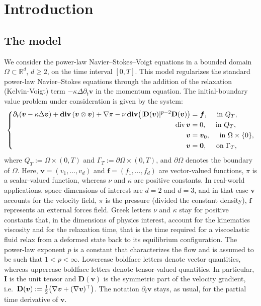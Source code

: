 \documentclass[12pt,reqno]{amsart}
\numberwithin{equation}{section}
\let\originalleft\left
\let\originalright\right
\renewcommand{\left}{\mathopen{}\mathclose\bgroup\originalleft}
\renewcommand{\right}{\aftergroup\egroup\originalright}
\theoremstyle{definition}
\def\1{\Omega}
\def\div{\operatorname{div}}
\def\divv{\mathbf{div}\,}
\def\vv{\boldsymbol{v}}
\def\f{\boldsymbol{f}}
\def\bfI{\mathbf{I}}
\def\bfD{\mathbf{D}}
\begin{document}
\section{Introduction}\label{sec1}

	\subsection{The model}
{   We consider the power-law Navier–Stokes–Voigt equations in a bounded domain $\Omega \subset \mathbb{R}^d$, $d \ge 2$, on the time interval $[0, T]$.
This model regularizes the standard power-law Navier–Stokes equations through the addition of the relaxation (Kelvin-Voigt) term $-\kappa\Delta\partial_t \vv$ in the momentum equation.
The initial-boundary value problem under consideration is given by the system:}
\begin{equation}\label{1.1}
	\left\{	
	\begin{aligned}
	{\partial_t(\vv -\kappa \Delta \vv ) +\divv(\vv\otimes \vv)+\nabla \pi -\nu\,\divv\!\left(|\bfD(\vv)|^{p-2}\bfD(\vv)\right)} & = {\f },\quad \text{ in }Q_T,  \\
		\div\vv &=0,\quad \text{ in }Q_T,  \\
		\vv &=\vv_0,\quad \text{ in }\1\times\{0\},  \\
		\vv &=\boldsymbol{0},\quad \text{ on }\Gamma_T,
	\end{aligned}
\right.
\end{equation}
where $Q_T:=\1\times(0,T)$ and $\Gamma_T:=\partial\1\times(0,T)$, and $\partial\1$ denotes the boundary of $\Omega$.
Here, $\vv=(v_1,\dots,v_d)$ and $\f=(f_1,\dots,f_d)$ are vector-valued functions, $\pi $ is a scalar-valued function, whereas $\nu$ and $\kappa$  are positive constants.
In real-world applications, space dimensions of interest are $d=2$ and $d=3$, and in that case $\vv$ accounts for the velocity field, $\pi $ is the pressure (divided the constant density),
$\f$ represents an external forces field.
Greek letters $\nu$ and $\kappa$ stay for positive constants that, in the dimensions of physics interest, account for the kinematics viscosity and for the relaxation time, that is
 the time required for a viscoelastic fluid relax from a deformed state back to its equilibrium configuration.
The power-law exponent $p$ is a constant that characterizes the flow and is assumed to be such that $1<p<\infty$.
	Lowercase boldface letters denote vector quantities, whereas uppercase boldface letters denote tensor-valued quantities.
In particular, $\bfI$ is the unit tensor and $\bfD(\vv)$ is the symmetric part of the velocity gradient, i.e.~$\bfD(\vv):=\frac{1}{2}\left(\nabla \vv + (\nabla \vv)^{\top}\right)$.
The notation ${\partial_t\vv}$ stays, as usual, for the partial time derivative of $\vv$.
\end{document}
